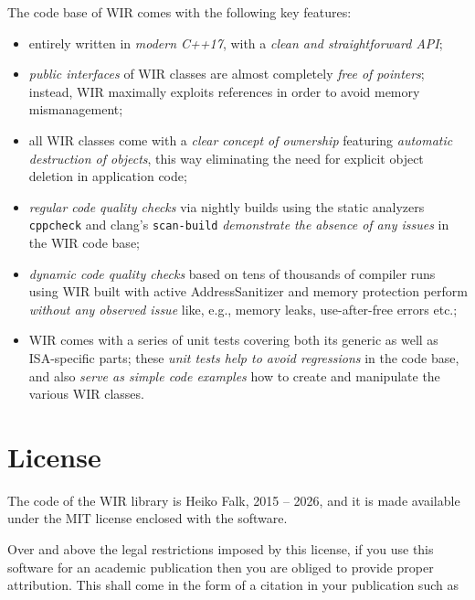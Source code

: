 The code base of \gls{WIR} comes with the following key features:
\begin{itemize}
  \item entirely written in \textit{modern C++17}, with a \textit{clean and straightforward \gls{API}};
  \item \textit{public interfaces} of \gls{WIR} classes are almost completely \textit{free of pointers}; instead, \gls{WIR} maximally exploits references in order to avoid memory mismanagement;
  \item all \gls{WIR} classes come with a \textit{clear concept of ownership} featuring \textit{automatic destruction of objects}, this way eliminating the need for explicit object deletion in application code;
  \item \textit{regular code quality checks} via nightly builds using the static analyzers \texttt{cppcheck} and clang's \texttt{scan-build} \textit{demonstrate the absence of any issues} in the \gls{WIR} code base;
  \item \textit{dynamic code quality checks} based on tens of thousands of compiler runs using \gls{WIR} built with active AddressSanitizer and memory protection perform \textit{without any observed issue} like, e.g., memory leaks, use-after-free errors etc.;
  \item \gls{WIR} comes with a series of unit tests covering both its generic as well as \gls{ISA}-specific parts; these \textit{unit tests help to avoid regressions} in the code base, and also \textit{serve as simple code examples} how to create and manipulate the various \gls{WIR} classes.
\end{itemize}


\section{License}
\label{sec:license}

The code of the \gls{WIR} library is \textcopyright{} Heiko Falk, 2015 -- 2026, and it is made available under the MIT license enclosed with the software.

Over and above the legal restrictions imposed by this license, if you use this software for an academic publication then you are obliged to provide proper attribution.
This shall come in the form of a citation in your publication such as

